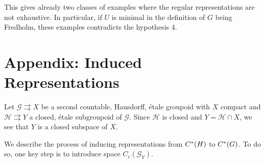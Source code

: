 \documentclass[a4paper]{amsart}
\newcommand{\tto}{\rightrightarrows}
\newcommand\Cstar{C\sp{\ast}}
\newcommand{\maG}{\mathcal G}
\newcommand{\maH}{\mathcal H}
\newcommand\<{\langle}
\renewcommand\>{\rangle}
\theoremstyle{definition}
\theoremstyle{remark}
\begin{document}
This gives already two classes of examples where the regular representations are not exhaustive. In particular, if $U$ is minimal in the definition of $G$ being Fredholm, these examples contradicts the hypothesis 4. 

\newpage
\section{Appendix: Induced Representations}

Let $\maG\tto X$ be a second countable, Hausdorff, \'etale groupoid with $X$ compact and $\maH \tto Y$ a closed, \'etale subgroupoid of $\maG$.
Since $\maH$ is closed and $Y=\maH \cap X$, we see that $Y$ is a closed subspace of $X$.

We describe the process of inducing representations from $\Cstar(H)$ to $\Cstar(G)$. To do so, one key step is to introduce space $C_c(\maG_Y)$.
\end{document}

